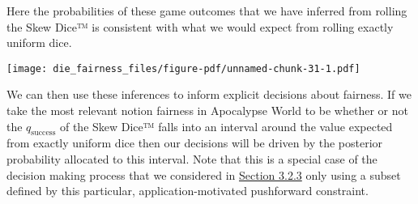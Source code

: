 \documentclass[
  letterpaper,
  DIV=11,
  numbers=noendperiod]{scrartcl}
\newenvironment{Shaded}{\begin{snugshade}}{\end{snugshade}}
\newcommand{\AttributeTok}[1]{\textcolor[rgb]{0.40,0.45,0.13}{#1}}
\newcommand{\DecValTok}[1]{\textcolor[rgb]{0.68,0.00,0.00}{#1}}
\newcommand{\FunctionTok}[1]{\textcolor[rgb]{0.28,0.35,0.67}{#1}}
\newcommand{\NormalTok}[1]{\textcolor[rgb]{0.00,0.23,0.31}{#1}}
\newcommand{\SpecialCharTok}[1]{\textcolor[rgb]{0.37,0.37,0.37}{#1}}
\newcommand{\StringTok}[1]{\textcolor[rgb]{0.13,0.47,0.30}{#1}}
\begin{document}
Here the probabilities of these game outcomes that we have inferred from
rolling the Skew Dice™ is consistent with what we would expect from
rolling exactly uniform dice.

\begin{Shaded}
\end{Shaded}

\texttt{[image: die\_fairness\_files/figure-pdf/unnamed-chunk-31-1.pdf]}

We can then use these inferences to inform explicit decisions about
fairness. If we take the most relevant notion fairness in Apocalypse
World to be whether or not the \(q_{\mathrm{success}}\) of the Skew
Dice™ falls into an interval around the value expected from exactly
uniform dice then our decisions will be driven by the posterior
probability allocated to this interval. Note that this is a special case
of the decision making process that we considered in
\hyperref[sec:decisions]{Section 3.2.3} only using a subset defined by
this particular, application-motivated pushforward constraint.
\end{document}
